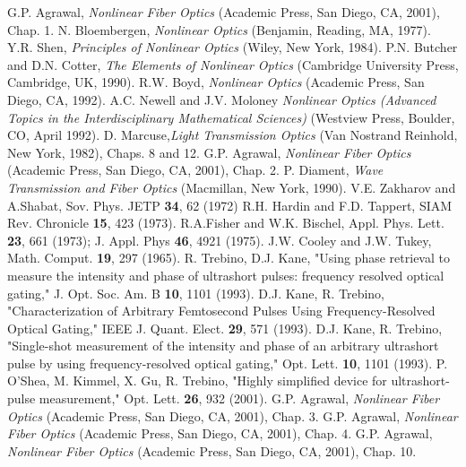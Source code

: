 \begin{thebibliography}{99}
\setlength{\parskip}{1em}

 G.P. Agrawal, {\em Nonlinear Fiber Optics} (Academic
Press, San Diego, CA, 2001), Chap. 1.
 N. Bloembergen, {\em Nonlinear Optics} (Benjamin,
Reading, MA, 1977).
 Y.R. Shen, {\em Principles of Nonlinear Optics} (Wiley, New
York, 1984).
 P.N. Butcher and D.N. Cotter, {\em The Elements of
Nonlinear Optics} (Cambridge University Press, Cambridge, UK, 1990).
 R.W. Boyd, {\em Nonlinear Optics} (Academic Press, San Diego,
CA, 1992).
 A.C. Newell and J.V. Moloney {\em Nonlinear Optics (Advanced Topics in the Interdisciplinary Mathematical Sciences)} (Westview Press, Boulder, CO, April 1992). 
 D. Marcuse,{\em Light Transmission Optics} (Van Nostrand
Reinhold, New York, 1982), Chaps. 8 and 12.
 G.P. Agrawal, {\em Nonlinear Fiber Optics} (Academic
Press, San Diego, CA, 2001), Chap. 2.
 P. Diament, {\em Wave Transmission and Fiber Optics}
(Macmillan, New York, 1990).
 V.E. Zakharov and A.Shabat, Sov. Phys. JETP 
\textbf{34}, 62 (1972)
 R.H. Hardin and F.D. Tappert, SIAM
Rev. Chronicle \textbf{15}, 423 (1973).
 R.A.Fisher and
W.K. Bischel, Appl. Phys. Lett. \textbf{23}, 661 (1973); J. Appl. Phys
\textbf{46}, 4921 (1975).
 J.W. Cooley and J.W. Tukey,
Math. Comput. \textbf{19}, 297 (1965).
 R. Trebino, D.J. Kane, "Using phase retrieval to measure
the intensity and phase of ultrashort pulses: frequency resolved optical gating," J. Opt. Soc. Am. B \textbf{10}, 1101 (1993). 
 D.J. Kane, R. Trebino, "Characterization of Arbitrary Femtosecond Pulses Using Frequency-Resolved Optical Gating," IEEE J. Quant. Elect. \textbf{29}, 571 (1993). 
 D.J. Kane, R. Trebino, "Single-shot measurement of the intensity and phase of an arbitrary ultrashort pulse  by using frequency-resolved optical gating," Opt. Lett. \textbf{10}, 1101 (1993).
P. O'Shea, M. Kimmel, X. Gu, R. Trebino, "Highly simplified device for ultrashort-pulse measurement," Opt. Lett. \textbf{26}, 932 (2001).
 G.P. Agrawal, {\em Nonlinear Fiber Optics} (Academic
Press, San Diego, CA, 2001), Chap. 3.
 G.P. Agrawal, {\em Nonlinear Fiber Optics} (Academic
Press, San Diego, CA, 2001), Chap. 4.
 G.P. Agrawal, {\em Nonlinear Fiber Optics} (Academic
Press, San Diego, CA, 2001), Chap. 10.

\end{thebibliography}
